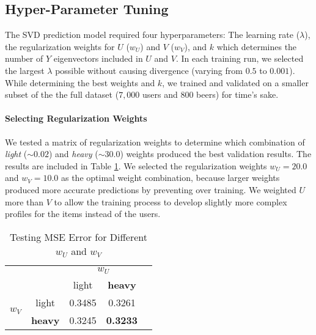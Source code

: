 \documentclass[12pt]{article}
\begin{document}
\subsection*{Hyper-Parameter Tuning}
The SVD prediction model required four hyperparameters: The learning rate ($\lambda$), the regularization weights for $U$ ($w_U$) and $V$ ($w_V$), and $k$ which determines the number of $Y$ eigenvectors included in $U$ and $V$. In each training run, we selected the largest $\lambda$ possible without causing divergence (varying from $0.5$ to $0.001$). While determining the best weights and $k$, we trained and validated on a smaller subset of the the full dataset ($7,000$ users and $800$ beers) for time's sake.

\paragraph{Selecting Regularization Weights} We tested a matrix of regularization weights to determine which combination of \textit{light} ($\sim 0.02$) and \textit{heavy} ($\sim 30.0$) weights produced the best validation results. The results are included in Table \ref{tab:weight_table}. We selected the regularization weights $w_U = 20.0$ and $w_V = 10.0$ as the optimal weight combination, because larger weights produced more accurate predictions by preventing over training. We weighted $U$ more than $V$ to allow the training process to develop slightly more complex profiles for the items instead of the users. 

\begin{table}[ht!]
\centering
\caption{Testing MSE Error for Different $w_U$ and $w_V$}
\label{tab:weight_table}
\begin{tabular}{lcccl}
                                           & \multicolumn{1}{l}{}       & \multicolumn{2}{c}{$w_U$}                                &  \\ \cline{3-4}
                                           & \multicolumn{1}{c|}{}      & \multicolumn{1}{c|}{light} & \multicolumn{1}{c|}{\textbf{heavy}} &  \\ \cline{2-4}
\multicolumn{1}{l|}{\multirow{2}{*}{$w_V$}} & \multicolumn{1}{c|}{light} & 0.3485                     & 0.3261                     &  \\ \cline{2-2}
\multicolumn{1}{l|}{}                      & \multicolumn{1}{c|}{\textbf{heavy}} & 0.3245                     & \textbf{0.3233}                      &  \\ \cline{2-2}
\end{tabular}
\end{table}
\end{document}
